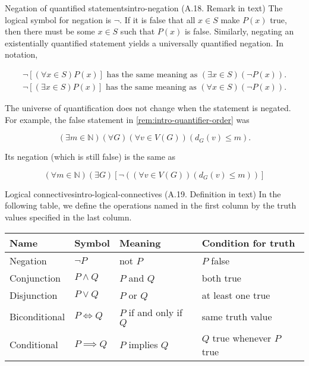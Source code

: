 \documentclass[../src/handouts/main.tex]{subfiles}
\begin{document}
\begin{remark}{Negation of quantified statements}{intro-negation}
  (A.18. Remark in text)
  The logical symbol for negation is $\neg$. If it is false that all $x \in S$ make $P(x)$ true, then there must be some $x \in S$ such that $P(x)$ is false. Similarly, negating an existentially quantified statement yields a universally quantified negation. In notation,

  $$
    \begin{aligned}
      \neg[(\forall x \in S) P(x)] \text{ has the same meaning as } (\exists x \in S)(\neg P(x)). \\
      \neg[(\exists x \in S) P(x)] \text{ has the same meaning as } (\forall x \in S)(\neg P(x)).
    \end{aligned}
  $$

  The universe of quantification does not change when the statement is negated.
  For example, the false statement in \cref{rem:intro-quantifier-order} was

  $$
    (\exists m \in \mathbb{N})(\forall G)(\forall v \in V(G))\left(d_G(v) \leq m\right) .
  $$

  Its negation (which is still false) is the same as

  $$
    (\forall m \in \mathbb{N})(\exists G)\left[\neg\left((\forall v \in V(G))\left(d_G(v) \leq m\right)\right)\right]
  $$
\end{remark}

\begin{definition}{Logical connectives}{intro-logical-connectives}
  (A.19. Definition in text)
  In the following table, we define the operations named in the first column by the truth values specified in the last column.

  \centering
  \begin{tabular}{l|lll}
    Name          & Symbol         & Meaning                & Condition for truth        \\ \hline
    Negation      & $\neg P$       & not $P$                & $P$ false                  \\
    Conjunction   & $P \wedge Q$   & $P$ and $Q$            & both true                  \\
    Disjunction   & $P \vee Q$     & $P$ or $Q$             & at least one true          \\
    Biconditional & $P \iff Q$     & $P$ if and only if $Q$ & same truth value           \\
    Conditional   & $P \implies Q$ & $P$ implies $Q$        & $Q$ true whenever $P$ true
  \end{tabular}
\end{definition}
\end{document}
